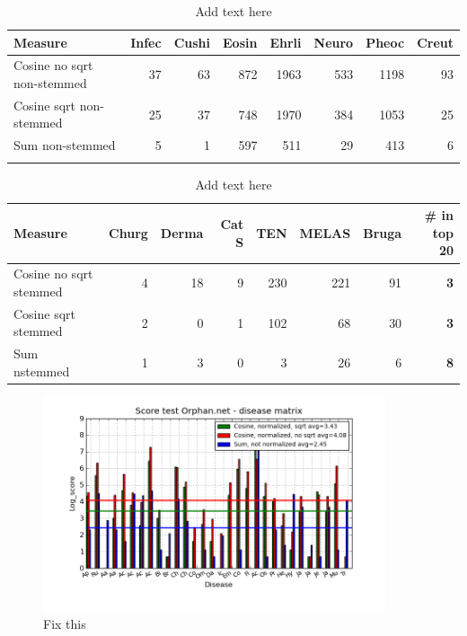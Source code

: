 \begin{table}[H]
  \begin{tiny}
  \caption{Add text here}
  \label{testResult}
  \begin{tabular}{|l|r|r|r|r|r|r|r|}
    \hline
    Measure &Infec&Cushi&Eosin&Ehrli&Neuro&Pheoc&Creut \\
    \hline
    Cosine no sqrt non-stemmed &37&63&872&1963&533&1198&93 \\
    \hline
    Cosine sqrt non-stemmed &25&37&748&1970&384&1053&25 \\
    \hline
    Sum non-stemmed &5&1&597&511&29&413&6 \\
    \hline
  \multicolumn{8}{c}{} \\
  \end{tabular}
  \begin{tabular}{|l|r|r|r|r|r|r|r|}
    \hline
    Measure &Churg&Derma&Cat S&TEN&MELAS&Bruga& \scriptsize{\textbf{\# in top 20}} \\
    \hline
    Cosine no sqrt stemmed &4&18&9&230&221&91 &\scriptsize{\textbf{3}} \\
    \hline
    Cosine sqrt stemmed &2&0&1&102&68&30 &  \scriptsize{\textbf{3}}\\
    \hline
    Sum nstemmed &1&3&0&3&26&6 & \scriptsize{\textbf{8}} \\
    \hline
  \end{tabular}
  \end{tiny}
\end{table}

\begin{figure}[H]
        \begin{center}
          \includegraphics[width=0.9\textwidth]{barcharts/diseaseMatrix_orphan_hist_NOTnorm_3000_s_cos_sqrt_cos_sum_nn.png}
        \end{center}
        \caption{Fix this}
        \label{diseaseMatrix_orphan_hist_NOTnorm_3000_s_cos_sqrt_cos_sum_nn}
\end{figure}

